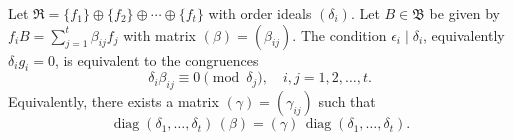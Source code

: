 Let $\mathfrak{R} = \{f_1\} \oplus \{f_2\} \oplus \cdots \oplus \{f_t\}$ with order ideals $(\delta_i)$. Let $B \in \mathfrak{B}$ be given by $f_i B = \sum_{j=1}^{t} \beta_{ij} f_j$ with matrix $(\beta) = (\beta_{ij})$. The condition $\epsilon_i \mid \delta_i$, equivalently $\delta_i g_i = 0$, is equivalent to the congruences
$$\delta_i \beta_{ij} \equiv 0 \pmod{\delta_j}, \quad i, j = 1, 2, \ldots, t.$$
Equivalently, there exists a matrix $(\gamma) = (\gamma_{ij})$ such that
$$\operatorname{diag}(\delta_1, \ldots, \delta_t) \, (\beta) = (\gamma) \, \operatorname{diag}(\delta_1, \ldots, \delta_t).$$
